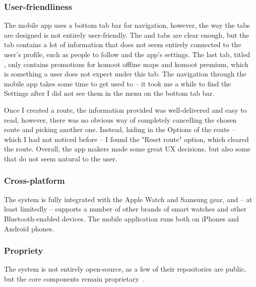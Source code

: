 \subsubsection*{User-friendliness}
The mobile app uses a bottom tab bar for navigation, however, the way the tabs are designed is not entirely user-friendly.
The  and  tabs are clear enough, but the  tab contains a lot of information that does not seem entirely connected to the user's profile, such as people to follow and the app's settings.
The last tab, titled , only contains promotions for komoot offline maps and komoot premium, which is something a user does not expect under this tab.
The navigation through the mobile app takes some time to get used to -- it took me a while to find the Settings after I did not see them in the menu on the bottom tab bar.

Once I created a route, the information provided was well-delivered and easy to read, however, there was no obvious way of completely cancelling the chosen route and picking another one.
Instead, hiding in the Options of the route -- which I had not noticed before -- I found the "Reset route" option, which cleared the route.
Overall, the app makers made some great UX decisions, but also some that do not seem natural to the user.
\subsubsection*{Cross-platform}
The system is fully integrated with the Apple Watch and Samsung gear, and -- at least limitedly -- supports a number of other brands of smart watches and other Bluetooth-enabled devices.
The mobile application runs both on iPhones and Android phones.
\subsubsection*{Propriety}
The system is not entirely open-source, as a few of their repositories are public, but the core components remain proprietary~\cite{komoot-github}.

